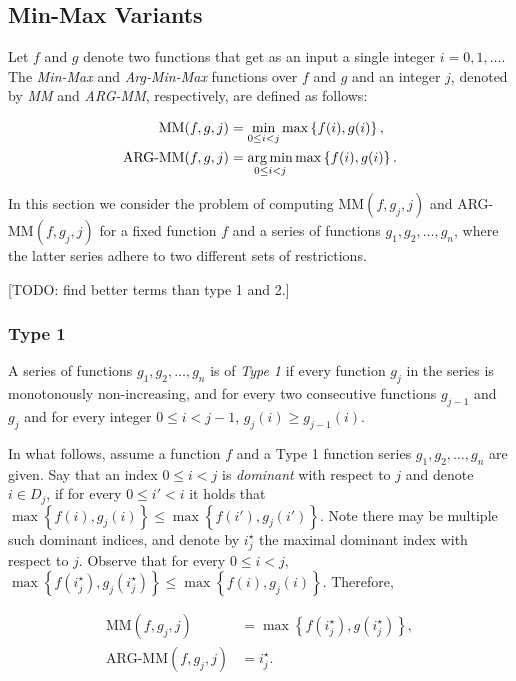 \subsection{Min-Max Variants}

Let $f$ and $g$ denote two functions that get as an input a single integer $i = 0, 1, \ldots$. The \emph{Min-Max} and \emph{Arg-Min-Max} functions over $f$ and $g$ and an integer $j$, denoted by \emph{MM} and \emph{ARG-MM}, respectively, are defined as follows:

\begin{align}
	\text{MM}(f, g, j) &= \min_{0 \leq i < j} \max \left\{f(i), g(i)\right\}, 
	\label{eq:MM} \\
	\text{ARG-MM}(f, g, j) &= \operatorname*{arg\,min}_{0 \leq i < j} \max \left\{f(i), g(i)\right\}.
	\label{eq:ARG-MM}
\end{align}


In this section we consider the problem of computing MM$(f, g_j, j)$ and ARG-MM$(f, g_j, j)$ for a fixed function $f$ and a series of functions $g_1, g_2, \ldots, g_n$, where the latter series adhere to two different sets of restrictions. 

[TODO: find better terms than type 1 and 2.]

\subsubsection{Type 1}

A series of functions $g_1, g_2, \ldots, g_n$ is of \emph{Type 1} if every function $g_j$ in the series is monotonously non-increasing, and for every two consecutive functions $g_{j-1}$ and $g_j$ and for every integer $0 \leq i < j-1$, $g_j(i) \geq g_{j-1}(i)$.

In what follows, assume a function $f$ and a Type 1 function series $g_1, g_2, \ldots, g_n$ are given.
Say that an index $0 \leq i < j$ is \emph{dominant} with respect to $j$ and denote $i \in D_j$, if for every $0 \leq i' < i$ it holds that $\max\left\{f(i), g_j(i)\right\} \leq \max\left\{f(i'), g_j(i')\right\}$. Note there may be multiple such dominant indices, and denote by $i^\star_j$ the maximal dominant index with respect to $j$. Observe that for every $0 \leq i < j$, $\max\left\{f(i^\star_j), g_j(i^\star_j)\right\} \leq \max\left\{f(i), g_j(i)\right\}$. Therefore, 

\begin{align}
	\text{MM}(f, g_j, j) &= \max\left\{f(i^\star_j), g(i^\star_j)\right\},
	\label{eq:MM1} \\
	\text{ARG-MM}(f, g_j, j) &= i^\star_j.
	\label{eq:ARG-MM1} 
\end{align}

